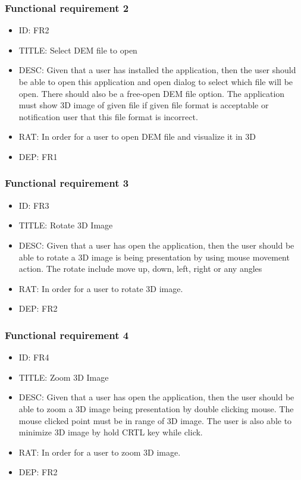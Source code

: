 \documentclass[11pt]{article}
\begin{document}
\subsubsection{Functional requirement 2}
\begin{itemize}
\item ID: FR2
\item TITLE: Select DEM file to open
\item DESC: Given that a user has installed the application, then the user should be able to open this application and open dialog to select which file will be open. There should also be a free-open DEM file option. The application must show 3D image of given file if given file format is acceptable or notification user that this file format is incorrect.
\item RAT: In order for a user to open DEM file and visualize it in 3D
\item DEP: FR1
\end{itemize}
\subsubsection{Functional requirement 3}
\begin{itemize}
\item ID: FR3
\item TITLE: Rotate 3D Image
\item DESC: Given that a user has open the application, then the user should be able to rotate a 3D image is being presentation by using mouse movement action. The rotate include move up, down, left, right or any angles
\item RAT: In order for a user to rotate 3D image.
\item DEP: FR2
\end{itemize}
\subsubsection{Functional requirement 4}
\begin{itemize}
\item ID: FR4
\item TITLE: Zoom 3D Image
\item DESC: Given that a user has open the application, then the user should be able to zoom a 3D image being presentation by double clicking mouse. The mouse clicked point must be in range of 3D image. The user is also able to minimize 3D image by hold CRTL key while click.
\item RAT: In order for a user to zoom 3D image.
\item DEP: FR2
\end{itemize}
\end{document}
